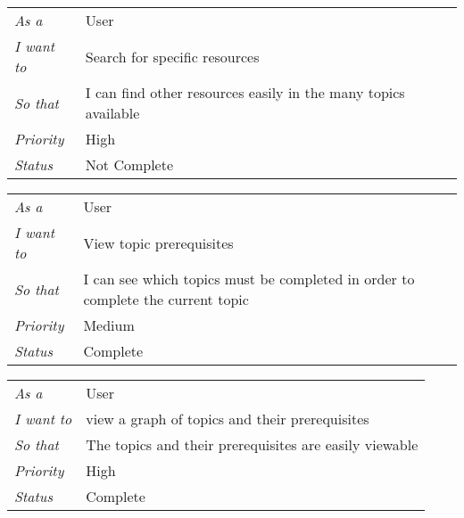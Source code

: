 \begin{table}[]
\begin{tabular}{ll}
\textit{As a}      & User                                                           \\
\textit{I want to} & Search for specific resources                                  \\
\textit{So that}   & I can find other resources easily in the many topics available \\
\textit{Priority}  & {\color[HTML]{FE0000} High}                                    \\
\textit{Status}    & Not Complete                                                  
\end{tabular}
\end{table}

\begin{table}[]
\begin{tabular}{ll}
\textit{As a}      & User                                                                            \\
\textit{I want to} & View topic prerequisites                                                        \\
\textit{So that}   & I can see which topics must be completed in order to complete the current topic \\
\textit{Priority}  & {\color[HTML]{FE996B} Medium}                                                     \\
\textit{Status}    & Complete                                                                       
\end{tabular}
\end{table}

\begin{table}[]
\begin{tabular}{ll}
\textit{As a}      & User                                                   \\
\textit{I want to} & view a graph of topics and their prerequisites         \\
\textit{So that}   & The topics and their prerequisites are easily viewable \\
\textit{Priority}  & {\color[HTML]{FE0000} High}                            \\
\textit{Status}    & Complete                                              
\end{tabular}
\end{table}

